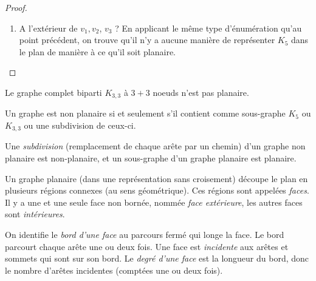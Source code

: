 \begin{mytheo}
\begin{proof}
\begin{enumerate}
\begin{enumerate}
\begin{center}
      \end{center}
    \end{enumerate}
    \item A l'extérieur de $v_1, v_2$, $v_3$ ? En applicant le même type d'énumération qu'au point précédent, on trouve qu'il n'y a aucune manière de représenter $K_5$ dans le plan de manière à ce qu'il soit planaire.
  \end{enumerate}
  \end{proof}
\end{mytheo}



\begin{mytheo}
Le graphe complet biparti $K_{3,3}$ à $3+3$ noeuds n'est pas planaire.
\end{mytheo}



\begin{mytheo} [Kuratowski]
  Un graphe est non planaire si et seulement s'il contient comme sous-graphe $K_5$ ou $K_{3,3}$ ou une subdivision de ceux-ci.
\end{mytheo}


\begin{mydef}
  Une \emph{subdivision} (remplacement de chaque arête par un chemin) d'un graphe non planaire est non-planaire, et un sous-graphe d'un graphe planaire est planaire.
\end{mydef}

\begin{mydef}
  Un graphe planaire (dans une représentation sans croisement) découpe le plan en plusieurs régions connexes (au sens géométrique). Ces régions sont appelées \emph{faces}. Il y a une et une seule face non bornée, nommée \emph{face extérieure}, les autres faces sont \emph{intérieures}.
\end{mydef}

\begin{mydef}
  On identifie le \emph{bord d'une face} au parcours fermé qui longe la face. Le bord parcourt chaque arête une ou deux fois.
  Une face est \emph{incidente} aux arêtes et sommets qui sont sur son bord.
  Le \emph{degré d'une face} est la longueur du bord, donc le nombre d'arêtes incidentes (comptées une ou deux fois).
\end{mydef}

